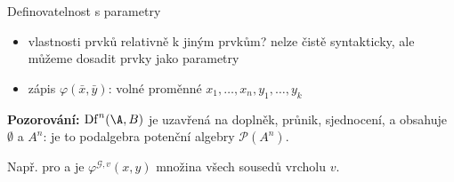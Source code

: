 \documentclass{beamer}
\begin{document}
\begin{frame}{Definovatelnost s parametry}

    \pause
    \begin{itemize}
        \item vlastnosti prvků relativně k jiným prvkům? nelze čistě syntakticky, ale můžeme dosadit prvky jako \alert{parametry}\pause
        \item zápis \alert{$\varphi(\bar x,\bar y)$}: volné proměnné $x_1,\dots,x_n,y_1,\dots,y_k$\pause
    \end{itemize}


    \pause
    \textbf{Pozorování:} $\mathrm{Df}^n(\A,B)$ je uzavřená na doplněk, průnik, sjednocení, a obsahuje $\emptyset$ a $A^n$: je to \alert{podalgebra potenční algebry} $\mathcal P(A^n)$.

    \pause
    \medskip
    Např. pro  a  je $\varphi^{\mathcal G,v}(x,y)$ množina všech sousedů vrcholu $v$.
    
\end{frame}
\end{document}

